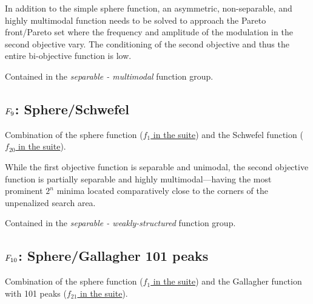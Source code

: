 In addition to the simple sphere function, an asymmetric, non-separable,
and highly multimodal function needs to be solved to approach the Pareto
front/Pareto set where the frequency and amplitude of the modulation
in the second objective vary. The conditioning of the second objective
and thus the entire bi-objective function is low.

Contained in the \emph{separable - multimodal} function group.



\subsection[\texorpdfstring{\protect\(F_9\protect\): Sphere/Schwefel}{F9: Sphere/Schwefel}]{\texorpdfstring{\protect\(F_9\protect\): Sphere/Schwefel}{}}
\label{index:f9}\label{index:sphere-schwefel}
Combination of the sphere function (\href{https://coco.gforge.inria.fr/downloads/download16.00/bbobdocfunctions.pdf\#page=5}{\(f_1\) in the \bbob suite})
and the Schwefel function (\href{https://coco.gforge.inria.fr/downloads/download16.00/bbobdocfunctions.pdf\#page=100}{\(f_{20}\) in the \bbob suite}).

While the first objective function is separable and unimodal,
the second objective function is partially separable and highly
multimodal---having the most prominent \(2^n\) minima located
comparatively close to the corners of the unpenalized search area.

Contained in the \emph{separable - weakly-structured} function group.



\subsection[\texorpdfstring{\protect\(F_{10}\protect\): Sphere/Gallagher 101 peaks}{F10: Sphere/Gallagher 101 peaks}]{\texorpdfstring{\protect\(F_{10}\protect\): Sphere/Gallagher 101 peaks}{}}
\label{index:f10}\label{index:sphere-gallagher-101-peaks}
Combination of the sphere function (\href{https://coco.gforge.inria.fr/downloads/download16.00/bbobdocfunctions.pdf\#page=5}{\(f_1\) in the \bbob suite})
and the Gallagher function with 101 peaks (\href{https://coco.gforge.inria.fr/downloads/download16.00/bbobdocfunctions.pdf\#page=105}{\(f_{21}\) in the \bbob suite}).

